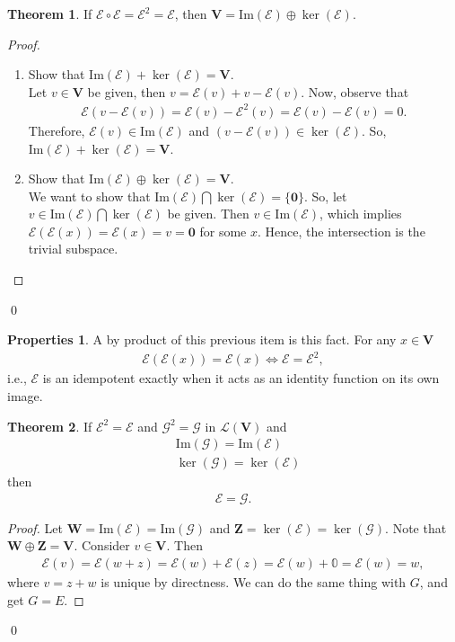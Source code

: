 \documentclass{book}
\theoremstyle{definition}
\newtheorem{prop}{Properties}[section]
\newtheorem{thm}{Theorem}[section]
\newcommand{\V}{\mathbf{V}}
\newcommand{\W}{\mathbf{W}}
\newcommand{\Z}{\mathbf{Z}}
\newcommand{\lag}{\mathcal{L}}
\newcommand{\E}{\mathcal{E}}
\newcommand{\ima}{\text{Im}}
\begin{document}
\begin{thm}
	If $\E \circ \E = \E^2 = \E$, then $\V = \ima(\E)\oplus \ker(\E)$.
	
	\begin{proof}
		$\,$
		\begin{enumerate}
			\item Show that $\ima(\E) + \ker(\E) = \V$.\\
			
			Let $v\in \V$ be given, then $v = \E(v) + v - \E(v)$. Now, observe that
			\begin{align*}
			\E(v - \E(v)) = \E(v) - \E^2(v) = \E(v) - \E(v) = 0.
			\end{align*}
			Therefore, $\E(v)\in \ima(\E)$ and $ (v - \E(v)) \in \ker(\E)$. So, $\ima(\E) + \ker(\E) = \V$.
			
			
			\item Show that $\ima(\E)\oplus \ker(\E) = \V$.\\
			
			We want to show that $\ima(\E) \bigcap \ker(\E) = \{\mathbf{0}\}$. So, let $v\in \ima(\E) \bigcap \ker(\E) $ be given. Then $v\in \ima(\E)$, which implies $\E(\E(x)) = \E(x) = v = \mathbf{0}$ for some $x$. Hence, the intersection is the trivial subspace.
	
			
			
		\end{enumerate}
	\end{proof} 
\qed
\end{thm} 

\begin{prop}
	A by product of this previous item is this fact. For any $x\in \V$
	\begin{align}
	\E(\E(x)) = \E(x) \iff \E = \E^2,
	\end{align}
	i.e., $\E$ is an idempotent exactly when it acts as an identity function on its own image.\\
\end{prop}


\begin{thm}
	If $\E^2 = \E$ and $\mathcal{G}^2 = \mathcal{G} $ in $\lag(\V)$ and 
	\begin{align*}
	&\ima(\mathcal{G}) = \ima(\E)\\
	&\ker(\mathcal{G}) = \ker(\E)
	\end{align*}
	then
	\begin{align*}
	\E = \mathcal{G}.
	\end{align*}
	
	\begin{proof}
		Let $\W = \ima(\E) = \ima(\mathcal{G})$ and $\Z = \ker(\E) = \ker(\mathcal{G})$. Note that $\W \oplus \Z = \V$. Consider $v\in \V$. Then
		\begin{align*}
		\E(v) = \E(w+z) = \E(w) + \E(z) = \E(w) + \mathbb{0} = \E(w) = w,
		\end{align*}
		where $v = z+w$ is unique by directness. We can do the same thing with $G$, and get $G = E$.
	\end{proof}
\qed
\end{thm}
\end{document}
